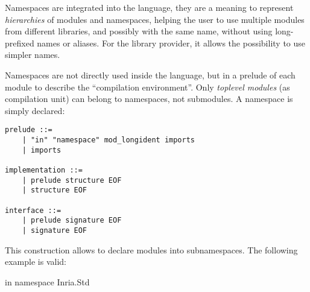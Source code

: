 \documentclass[11pt,a4paper]{article}
\begin{document}
Namespaces are integrated into the language, they are a meaning to represent
\emph{hierarchies} of modules and namespaces, helping the user to use multiple
modules from different libraries, and possibly with the same name, without using
long-prefixed names or aliases. For the library provider, it allows the
possibility to use simpler names.

Namespaces are not directly used inside the language, but in a prelude of each
module to describe the ``compilation environment''. Only \emph{toplevel modules}
(as compilation unit) can belong to namespaces, not submodules. A namespace is
simply declared: 

\begin{verbatim}
prelude ::=
    | "in" "namespace" mod_longident imports 
    | imports

implementation ::=
    | prelude structure EOF
    | structure EOF

interface ::=
    | prelude signature EOF
    | signature EOF
\end{verbatim}

This construction allows to declare modules into subnamespaces. The following
example is valid:

\begin{OCaml}
in namespace Inria.Std
\end{OCaml}



\medskip
\end{document}
